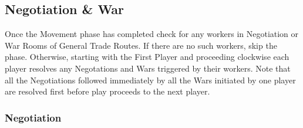 \documentclass[10pt,twocolumn]{article}
\begin{document}
\subsection{Negotiation \& War}
Once the Movement phase has completed check for any workers in Negotiation or War Rooms of General Trade Routes. If there are no such workers, skip the  phase. Otherwise, starting with the First Player and proceeding clockwise each player resolves any Negotations and Wars triggered by their workers. Note that all the Negotiations followed immediately by all the Wars initiated by one player are resolved first before play proceeds to the next player. 

\subsubsection{Negotiation}
\iftoggle{original-rules}{
If the active player has a worker on a Negotiation Room, he, and the player at the other end of the General Trade Route must now decide if they want to be peaceful or aggressive. If they want to be peaceful, they should indicate this with a ``thumbs-up'' gesture. If they want to be aggressive, they should indicate this with a ``thumbs-down'' gesture.
}{
If the active player has a worker on a Negotiation Room, he, and the player at the other end of the General Trade Route must now decide if they want to be peaceful or aggressive. To do this, one player takes the Patton token and the other player takes the Genghis Khan token. Each player secretly choses a side. If they want to be aggressive, they should indicate this by selecting the side which is red (which will have the number 1 on it). If they want to peaceful, they should indicate this by selecting the side which is blue (which will have the number 2 on it). Once both players have selected a side, they are revealed simultaneously and resolved as follows:
}
\end{document}
